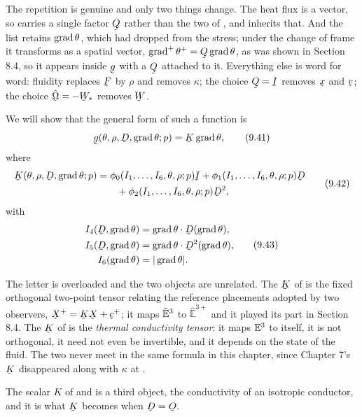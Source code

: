 The repetition is genuine and only two things change. The heat flux is a
vector, so  carries a single factor $\bQ$ rather than the two
of , and  inherits that. And the list retains
$\operatorname{grad}\theta$, which  had dropped from the stress; under the
change of frame it transforms as a spatial vector,
$\grad^{+}\theta^{+}=\bQ\grad\theta$, as was shown in Section 8.4, so it
appears inside $\bg$ with a $\bQ$ attached to it. Everything else is
word for word: fluidity replaces $\bF$ by $\rho$ and removes $\kappa$;
the choice $\bQ=\I$ removes $\bx$ and $\bv$; the choice
$\hat{\bOm}=-\bW_{*}$ removes $\bW$.

We will show that the general form of such a function is
\begin{equation}
   \bg(\theta,\rho,\bD,\grad\theta;p)=\bK\grad\theta,
   \tag{9.41}\label{eq:9.41}
\end{equation}
where
\begin{equation}
\begin{aligned}
   \bK(\theta,\rho,\bD,\grad\theta;p)
   &=\phi_{0}(I_{1},\ldots,I_{6},\theta,\rho;p)\I
    +\phi_{1}(I_{1},\ldots,I_{6},\theta,\rho;p)\bD\\
   &\qquad+\phi_{2}(I_{1},\ldots,I_{6},\theta,\rho;p)\bD^{2},
\end{aligned}
   \tag{9.42}\label{eq:9.42}
\end{equation}
with
\begin{equation}
\begin{aligned}
   I_{4}(\bD,\grad\theta)&=\ip{\grad\theta}{\bD(\grad\theta)},\\
   I_{5}(\bD,\grad\theta)&=\ip{\grad\theta}{\bD^{2}(\grad\theta)},\\
   I_{6}(\grad\theta)&=|\grad\theta| .
\end{aligned}
   \tag{9.43}\label{eq:9.43}
\end{equation}

\begin{remark}
\label{rem:ch9Kwarn}
The letter is overloaded and the two objects are unrelated. The $\bK$ of
 is the fixed orthogonal two-point tensor relating the
reference placements adopted by two observers, $\bX^{+}=\bK\bX+\bc^{+}$;
it maps $\hat{\mathbb{E}}^{3}$ to $\hat{\mathbb{E}}^{3+}$ and it played its part in
Section 8.4. The $\bK$ of  is the \emph{thermal conductivity
tensor}: it maps $\mathbb{E}^{3}$ to itself, it is not orthogonal, it need not even
be invertible, and it depends on the state of the fluid. The two never
meet in the same formula in this chapter, since Chapter 7's $\bK$
disappeared along with $\kappa$ at .

The scalar $K$ of  and  is a third object, the
conductivity of an isotropic conductor, and it is what $\bK$ becomes
when $\bD=\Ob$.
\end{remark}

